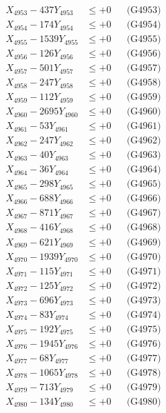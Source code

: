 \documentclass[a4paper,10pt]{article}
\begin{document}
{\begin{align}
X_{4953} - 437Y_{4953} &\leq +0 && \text{(G4953)} \\
X_{4954} - 174Y_{4954} &\leq +0 && \text{(G4954)} \\
X_{4955} - 1539Y_{4955} &\leq +0 && \text{(G4955)} \\
X_{4956} - 126Y_{4956} &\leq +0 && \text{(G4956)} \\
X_{4957} - 501Y_{4957} &\leq +0 && \text{(G4957)} \\
X_{4958} - 247Y_{4958} &\leq +0 && \text{(G4958)} \\
X_{4959} - 112Y_{4959} &\leq +0 && \text{(G4959)} \\
X_{4960} - 2695Y_{4960} &\leq +0 && \text{(G4960)} \\
\allowbreak
X_{4961} - 53Y_{4961} &\leq +0 && \text{(G4961)} \\
X_{4962} - 247Y_{4962} &\leq +0 && \text{(G4962)} \\
X_{4963} - 40Y_{4963} &\leq +0 && \text{(G4963)} \\
X_{4964} - 36Y_{4964} &\leq +0 && \text{(G4964)} \\
X_{4965} - 298Y_{4965} &\leq +0 && \text{(G4965)} \\
X_{4966} - 688Y_{4966} &\leq +0 && \text{(G4966)} \\
X_{4967} - 871Y_{4967} &\leq +0 && \text{(G4967)} \\
X_{4968} - 416Y_{4968} &\leq +0 && \text{(G4968)} \\
X_{4969} - 621Y_{4969} &\leq +0 && \text{(G4969)} \\
X_{4970} - 1939Y_{4970} &\leq +0 && \text{(G4970)} \\
\allowbreak
X_{4971} - 115Y_{4971} &\leq +0 && \text{(G4971)} \\
X_{4972} - 125Y_{4972} &\leq +0 && \text{(G4972)} \\
X_{4973} - 696Y_{4973} &\leq +0 && \text{(G4973)} \\
X_{4974} - 83Y_{4974} &\leq +0 && \text{(G4974)} \\
X_{4975} - 192Y_{4975} &\leq +0 && \text{(G4975)} \\
X_{4976} - 1945Y_{4976} &\leq +0 && \text{(G4976)} \\
X_{4977} - 68Y_{4977} &\leq +0 && \text{(G4977)} \\
X_{4978} - 1065Y_{4978} &\leq +0 && \text{(G4978)} \\
X_{4979} - 713Y_{4979} &\leq +0 && \text{(G4979)} \\
X_{4980} - 134Y_{4980} &\leq +0 && \text{(G4980)} \\

\end{align}}
\end{document}

